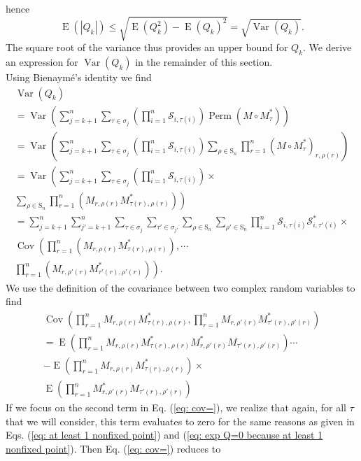 \documentclass[10pt,aps,pra,twocolumn,superscriptaddress]{revtex4-2}
\DeclareMathOperator{\E}{E}
\DeclareMathOperator{\Var}{Var}
\DeclareMathOperator{\Cov}{Cov}
\DeclareMathOperator{\Perm}{Perm}
\begin{document}
hence 
\begin{equation}
    \E(|Q_k|) \leq \sqrt{\E(Q_k^2)-\E(Q_k)^2} = \sqrt{\Var(Q_k)}.
\end{equation}
The square root of the variance thus provides an upper bound for $Q_k$. We derive an expression for $\Var(Q_k)$ in the remainder of this section. \\
Using Bienaymé's identity \cite{klenke_moments_2014} we find
\begin{multline}
    \Var(Q_k)\\
    =\Var\left(\sum_{j=k+1}^n\sum_{\tau \in \sigma_j}\left(\prod^n_{i=1}\mathcal{S}_{i,\tau(i)}\right) \Perm(M\circ M_{\tau}^*)\right) \\
    =\Var\left(\sum_{j=k+1}^n\sum_{\tau \in \sigma_j}\left(\prod^n_{i=1}\mathcal{S}_{i,\tau(i)}\right) \sum_{\rho\in\mathrm{S}_n}\prod_{r=1}^n(M\circ M_{\tau}^*)_{r,\rho(r)}\right)\\
    =\Var\left(\sum_{j=k+1}^n\sum_{\tau \in \sigma_j}\left(\prod^n_{i=1}\mathcal{S}_{i,\tau(i)}\right)\right.\times\\ 
    \left.\sum_{\rho\in\mathrm{S}_n}\prod_{r=1}^n\left(M_{r,\rho(r)} M_{\tau(r),\rho(r)}^*\right)\right)\\
    =\sum_{j=k+1}^n\sum_{j'=k+1}^n\sum_{\tau \in \sigma_j}\sum_{\tau' \in \sigma_{j'}} \sum_{\rho\in\mathrm{S}_n}\sum_{\rho'\in\mathrm{S}_n}\prod^n_{i=1}\mathcal{S}_{i,\tau(i)}\mathcal{S}^{*}_{i,\tau'(i)}\times\\
    \Cov\left(\prod_{r=1}^n\left(M_{r,\rho(r)} M_{\tau(r),\rho(r)}^*\right),\right.\cdots\\
    \left.\prod_{r=1}^n\left(M_{r,\rho'(r)} M_{\tau'(r),\rho'(r)}^*\right) \right).
    \label{eq: Var(Q) 6 sums}
\end{multline}
We use the definition of the covariance between two complex random variables to find
\begin{multline}
    \Cov\left(\prod_{r=1}^nM_{r,\rho(r)} M_{\tau(r),\rho(r)}^*,\prod_{r=1}^nM_{r,\rho'(r)} M_{\tau'(r),\rho'(r)}^*\right)\\
    =\E\left(\prod_{r=1}^n M_{r,\rho(r)} M_{\tau(r),\rho(r)}^* M^{*}_{r,\rho'(r)} M_{\tau'(r),\rho'(r)}\right)\cdots\\
    -\E\left(\prod_{r=1}^nM_{r,\rho(r)} M_{\tau(r),\rho(r)}^*\right)\times\\\E\left(\prod_{r=1}^nM^{*}_{r,\rho'(r)} M_{\tau'(r),\rho'(r)}\right)
    \label{eq: cov=}
\end{multline}
If we focus on the second term in Eq. (\ref{eq: cov=}), we realize that again, for all $\tau$ that we will consider, this term evaluates to zero for the same reasons as given in Eqs. (\ref{eq: at least 1 nonfixed point}) and (\ref{eq: exp Q=0 because at least 1 nonfixed point}). Then Eq. (\ref{eq: cov=}) reduces to 
\end{document}
